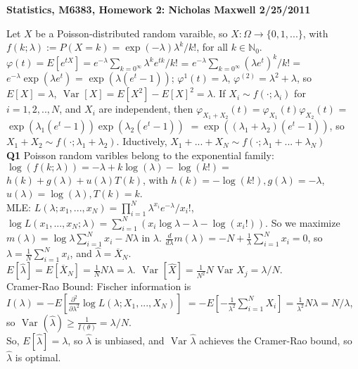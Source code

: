 \documentclass[12pt]{article}
\newcommand{\nats}[0] { \mathbb{N}}
\newcommand{\lam}[0] {  \lambda }
\newcommand{\Om}[0] { \Omega }
\newcommand{\Var}[0] { \text{ Var } }
\newcommand{\defeq}[0] { := }
\begin{document}
\begin{flushleft}
{\bf Statistics, M6383,  Homework 2: Nicholas Maxwell 2/25/2011}
\end{flushleft}



Let $X$ be a Poisson-distributed random varaible, so $X: \Om \to \{ 0, 1, ...\}$, with $f(k; \lam) \defeq P(X = k) = \exp(-\lam)\lam^k/k!$, for all $k \in \nats_0$. $\varphi(t) = E[e^{tX}] = e^{-\lam} \sum_{k=0^\infty} \lam^k e^{tk} / k!$ = $e^{-\lam} \sum_{k=0^\infty} (\lam e^{t})^k / k! = $  $e^{-\lam} \exp(\lam e^{t})$ = $\exp(\lam(e^{t}-1))$; $\varphi^{1}(t) = \lam$, $\varphi^{(2)} = \lam^2 + \lam$, so $E[X] = \lam$, $\Var[X] = E[X^2] - E[X]^2 = \lam$. If $X_i \sim f(\cdot; \lam_i)$ for $i = 1,2,..,N$, and $X_i$ are independent, then $\varphi_{X_1 + X_2}(t) = \varphi_{X_1}(t)\varphi_{X_2}(t)$ = $\exp(\lam_1(e^{t}-1)) \exp(\lam_2(e^{t}-1)) $ $= \exp((\lam_1 + \lam_2)(e^{t}-1))$, so $X_1 + X_2 \sim f(\cdot; \lam_1 + \lam_2)$. Iductively, $X_1 + ... + X_N \sim f(\cdot; \lam_1 + ... + \lam_N)$ \\

{\bf Q1} Poisson random varibles belong to the exponential family: $\log(f(k; \lam)) = -\lam + k\log(\lam) - \log(k!) = $ $h(k) + g(\lam) + u(\lam)T(k)$, with $h(k) = -\log(k!), g(\lam) = - \lam$, $u(\lam) = \log(\lam), T(k) = k$. \\

MLE: $L(\lam; x_1, ..., x_N) = \prod_{i=1}^N \lam^{x_i} e^{-\lam}/x_i!$, $\log L(x_1, ..., x_N; \lam) = \sum_{i=1}^N (x_i \log \lam - \lam - \log(x_i!))$. So we maximize $m(\lam) =  \log \lam \sum_{i=1}^N x_i- N \lam $ in $\lam$. $\frac{d}{d\lam} m(\lam) = -N + \frac{1}{\lam}  \sum_{i=1}^N x_i = 0$, so $\lam = \frac{1}{N} \sum_{i=1}^N x_i$, and $\hat \lam = \overline X_N$. \\

$E[\hat \lambda] = E[\overline X_N] = \frac{1}{N} N \lam = \lam$. $\Var[\hat X] = \frac{1}{N^2} N \Var{X_j} = \lam / N$. \\

Cramer-Rao Bound: Fischer information is $I(\lam) = -E[\frac{\partial^2}{\partial \lam^2} \log L(\lam; X_1, ..., X_N)]$ $= -E[-\frac{1}{\lam^2}  \sum_{i=1}^N X_i ] = \frac{1}{\lam^2} N \lam = N/\lam$, so $\Var(\hat \lambda) \ge \frac{1}{I(\theta)} = \lambda/N$. \\

So, $E[\hat \lam] = \lam$, so $\hat \lam$ is unbiased, and $\Var{\hat \lam}$ achieves the Cramer-Rao bound, so $\hat \lam$ is optimal. \\
\end{document}
